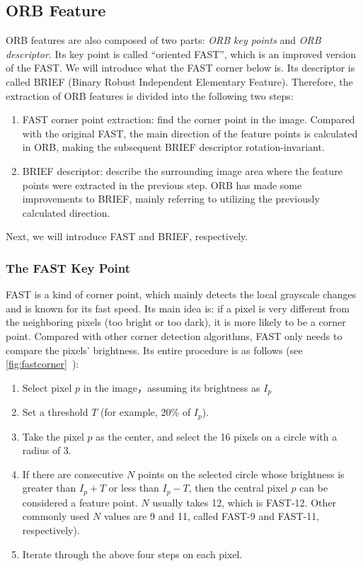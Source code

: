\subsection{ORB Feature}

ORB features are also composed of two parts: \textit{ORB key points} and \textit{ORB descriptor}. Its key point is called ``oriented FAST'', which is an improved version of the FAST. We will introduce what the FAST corner below is. Its descriptor is called BRIEF (Binary Robust Independent Elementary Feature). Therefore, the extraction of ORB features is divided into the following two steps:
\begin{enumerate}
\item FAST corner point extraction: find the corner point in the image. Compared with the original FAST, the main direction of the feature points is calculated in ORB, making the subsequent BRIEF descriptor rotation-invariant.
\item BRIEF descriptor: describe the surrounding image area where the feature points were extracted in the previous step. ORB has made some improvements to BRIEF, mainly referring to utilizing the previously calculated direction.
\end{enumerate}

Next, we will introduce FAST and BRIEF, respectively.

\subsubsection{The FAST Key Point}
FAST is a kind of corner point, which mainly detects the local grayscale changes and is known for its fast speed. Its main idea is: if a pixel is very different from the neighboring pixels (too bright or too dark), it is more likely to be a corner point. Compared with other corner detection algorithms, FAST only needs to compare the pixels' brightness. Its entire procedure is as follows (see \autoref{fig:fastcorner}~):

\begin{enumerate}
\item Select pixel $p$ in the image，assuming its brightness as $I_{p}$
\item Set a threshold $T$ (for example, 20\% of $I_{p}$).
\item Take the pixel $p$ as the center, and select the 16 pixels on a circle with a radius of 3.
\item If there are consecutive $N$ points on the selected circle whose brightness is greater than $I_{p}+T$ or less than $I_{p}-T$, then the central pixel $p$ can be considered a feature point. $N$ usually takes 12, which is FAST-12. Other commonly used $N$ values ​​are 9 and 11, called FAST-9 and FAST-11, respectively).
\item Iterate through the above four steps on each pixel.
\end{enumerate}

